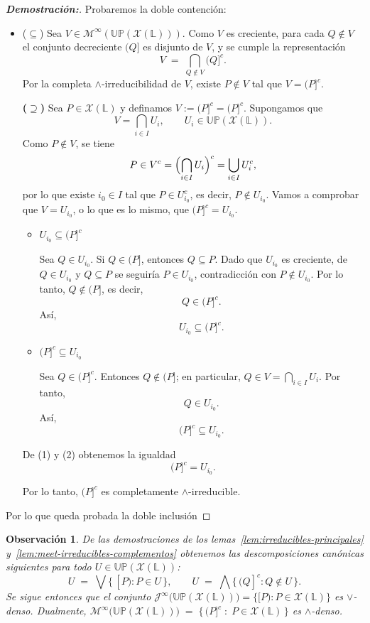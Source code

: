\documentclass[12pt]{book}
\newtheorem{remark}[theorem]{Observación}
\newcommand{\down}[1]{({#1}]}
\newcommand{\downc}[1]{({#1}]^{c}}
\newcommand{\Up}{\mathbb{UP}}
\begin{document}
\begin{proof}[\textbf{Demostración:}]
Probaremos la doble contención:

\begin{itemize}
\item (\(\subseteq\)) 
Sea $V\in\mathcal M^\infty(\Up(\mathcal{X}(\mathbb L)))$.  
Como $V$ es creciente, para cada $Q\notin V$ el conjunto decreciente $\down{Q}$ es disjunto de $V$, y se cumple la representación
\[
V \;=\; \bigcap_{Q\notin V}\downc{Q}.
\]
Por la completa $\wedge$-irreducibilidad de $V$, existe $P\notin V$ tal que $V=\downc{P}$.

\noindent\textbf{(\(\supseteq\))}  
Sea \(P\in\mathcal X(\mathbb L)\) y definamos \(V := (P]^{c}=\downc{P}\).  
Supongamos que
\[
V=\bigcap_{i\in I} U_i,
\qquad U_i\in\Up(\mathcal X(\mathbb L)).
\]
Como \(P\notin V\), se tiene
\[
P\in V^{c}
= \Bigl(\bigcap_{i\in I}U_i\Bigr)^{c}
= \bigcup_{i\in I} U_i^{c},
\]
por lo que existe \(i_0\in I\) tal que  
\(P\in U_{i_0}^{c}\), es decir, \(P\notin U_{i_0}\). Vamos a comprobar que \(V = U_{i_0}\), o lo que es lo mismo, que \((P]^{c}=U_{i_0}\).

\begin{itemize}
\item \(U_{i_0}\subseteq (P]^{c}\)

Sea \(Q\in U_{i_0}\).  
Si \(Q\in (P]\), entonces \(Q\subseteq P\).  
Dado que \(U_{i_0}\) es creciente, de \(Q\in U_{i_0}\) y \(Q\subseteq P\) se seguiría \(P\in U_{i_0}\), contradicción con \(P\notin U_{i_0}\).  
Por lo tanto, \(Q\notin (P]\), es decir,
\[
Q\in (P]^{c}.
\]
Así,
\[
U_{i_0}\subseteq (P]^{c}.
\]

\item \((P]^{c}\subseteq U_{i_0}\)

Sea \(Q\in (P]^{c}\).  
Entonces \(Q\notin (P]\); en particular, \(Q\in V=\bigcap_{i\in I}U_i\).  
Por tanto,
\[
Q\in U_{i_0}.
\]
Así,
\[
(P]^{c}\subseteq U_{i_0}.
\]
\end{itemize}

De (1) y (2) obtenemos la igualdad
\[
(P]^{c}=U_{i_0}.
\]

Por lo tanto, \(\downc{P}\) es completamente $\wedge$-irreducible.
\end{itemize}
Por lo que queda probada la doble inclusión
\end{proof}


\begin{remark}\label{rem:join-meet-densos}
De las demostraciones de los lemas~\ref{lem:irreducibles-principales} y~\ref{lem:meet-irreducibles-complementos}
obtenemos las descomposiciones canónicas siguientes para todo
$U\in\Up(\mathcal{X}(\mathbb{L}))$:
\[
U \;=\; \bigvee\{\, [P) : P\in U \,\},
\qquad
U \;=\; \bigwedge\{\, (Q]^c : Q\notin U \,\}.
\]
Se sigue entonces que el conjunto 
\(\mathcal J^\infty\bigl(\Up(\mathcal{X}(\mathbb L))\bigr)=\{[P):P\in\mathcal{X}(\mathbb L)\}\)
es $\vee$-denso. Dualmente, $\mathcal M^\infty\bigl(\Up(\mathcal{X}(\mathbb L))\bigr)
\;=\;
\bigl\{\,\downc{P}\;:\;P\in\mathcal{X}(\mathbb L)\,\bigr\}$ es $\wedge$-denso.
\end{remark}
\end{document}
